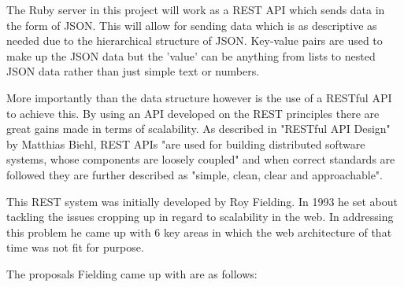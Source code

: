 The Ruby server in this project will work as a REST API which sends data in the form of JSON. This will allow for sending data which is as descriptive as needed due to the hierarchical structure of JSON. Key-value pairs are used to make up the JSON data but the 'value' can be anything from lists to nested JSON data rather than just simple text or numbers.

More importantly than the data structure however is the use of a RESTful API to achieve this. By using an API developed on the REST principles there are great gains made in terms of scalability. As described in "RESTful API Design"\cite{restfulapidesign} by Matthias Biehl, REST APIs "are used for building distributed software systems, whose components are loosely coupled"\cite{restfulapidesignbenefits} and when correct standards are followed they are further described as "simple, clean, clear and approachable"\cite{restfulapidesignbenefits}.

This REST system was initially developed by Roy Fielding. In 1993 he set about tackling the issues cropping up in regard to scalability in the web\cite{restapidesignwebusersreference}\cite{restphdthesisscaleproblem}. In addressing this problem he came up with 6 key areas in which the web architecture of that time was not fit for purpose. 

The proposals Fielding came up with are as follows:

